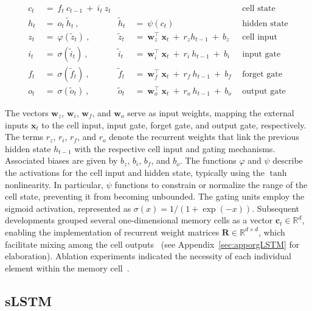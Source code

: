 \begin{align}
c_t \ &= \  f_t \ c_{t-1} \ + \ i_t \ z_t &  & &\text{cell state} \\
h_t  \ &= \ o_t \ \tilde{h}_t \ , & \tilde{h}_t \ &= \ \psi \left( c_t\right)
  &\text{hidden state} \\
z_t \ &= \ \varphi \left( \tilde{z}_t \right) \ , 
  &\tilde{z}_t \ &=  \ \mathbf{w}^\top_{z} \ \mathbf{x}_t \ + \
  r_{z}  h_{t-1} \ + \  b_{z} \ \
  &\text{cell input} \\
i_t \ &= \ \sigma \left( \tilde{i}_t  \right) \ , 
  &\tilde{i}_t \ &= \ \mathbf{w}^\top_{i} \ \mathbf{x}_t \ + \
  r_{i}  \ h_{t-1} \ + \  b_{i} \ \
  &\text{input gate} \\
f_t \ &= \ \sigma \left(  \tilde{f}_t \right) \ , 
  &\tilde{f}_t \ &= \ \mathbf{w}^\top_{f} \ \mathbf{x}_t  \ + \
  r_{f}  \ h_{t-1} \ + \  b_{f} \ \
  &\text{forget gate} \\
o_t \ &= \ \sigma \left( \tilde{o}_t \right) \ , 
  &\tilde{o}_t  \ &= \ \mathbf{w}^\top_{o} \ \mathbf{x}_t \ + \
  r_{o}  \ h_{t-1} \ + \  b_{o} \ \
  &\text{output gate} 
\end{align}

The vectors $\mathbf{w}_{z}$, $\mathbf{w}_{i}$,
$\mathbf{w}_{f}$, and $\mathbf{w}_{o}$ serve as input weights, mapping the external inputs $\mathbf{x}_t$ to the cell input, input gate, forget gate, and output gate, respectively. The terms $r_{z}$, $r_{i}$, $r_{f}$, and $r_{o}$ denote the recurrent weights that link the previous hidden state $h_{t-1}$ with the respective cell input and gating mechanisms. Associated biases are given by $b_{z}$, $b_{i}$, $b_{f}$, and $b_{o}$. The functions $\varphi$ and $\psi$ describe the activations for the cell input and hidden state, typically using the $\tanh$ nonlinearity. In particular, $\psi$ functions to constrain or normalize the range of the cell state, preventing it from becoming unbounded. The gating units employ the sigmoid activation, represented as $\sigma \left( x \right)= 1/(1+\exp(-x))$.
Subsequent developments grouped several one-dimensional memory cells as a vector $\mathbf{c}_t \in \mathbb{R}^{d}$, enabling the implementation of recurrent weight matrices $\mathbf{R} \in \mathbb{R}^{d \times d}$, which facilitate mixing among the cell outputs~\citep{Greff:15} (see Appendix~\ref{sec:apporgLSTM} for elaboration).
Ablation experiments indicated the necessity of each individual element within the memory cell~\citep{Greff:15}.

\subsection{sLSTM}
\label{sec:sLSTM}

